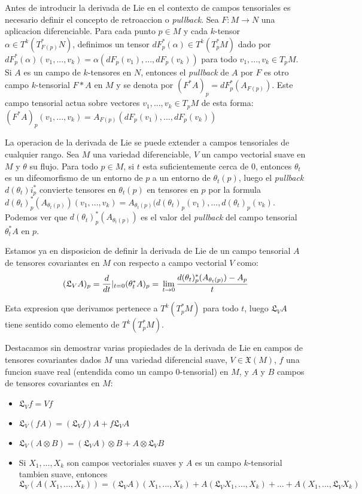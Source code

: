 \documentclass[12pt]{extarticle}
\newcommand{\<}{\langle}
\renewcommand{\>}{\rangle}
\theoremstyle{definition}
\begin{document}
Antes de introducir la derivada de Lie en el contexto de campos tensoriales es
necesario definir el concepto de retroaccion o \emph{pullback}. Sea $F: M
\rightarrow N$ una aplicacion diferenciable. Para cada punto $p \in M$ y cada
$k$-tensor $\alpha \in T^k(T^*_{F(p)}N)$, definimos un tensor $dF^*_p(\alpha)
\in T^k(T^*_pM)$ dado por $dF^*_p(\alpha)(v_1,...,v_k)=
\alpha(dF_p(v_1),...,dF_p(v_k))$ para todo $v_1,...,v_k \in T_pM$. Si $A$ es un
campo de $k$-tensores en $N$, entonces el \emph{pullback} de $A$ por $F$ es otro
campo $k$-tensorial $F*A$ en $M$ y se denota por $(F^*A)_p = dF^*_p(A_{F(p)})$.
Este campo tensorial actua sobre vectores $v_1,...,v_k \in T_pM$ de esta forma:
$(F^*A)_p (v_1,...,v_k) = A_{F(p)} (dF_p(v_1),...,dF_p(v_k))$

La operacion de la derivada de Lie se puede extender a campos tensoriales de
cualquier rango. Sea $M$ una variedad diferenciable, $V$ un campo vectorial
suave en $M$ y $\theta$ su flujo. Para todo $p \in M$, si $t$ esta
suficientemente cerca de $0$, entonces $\theta_t$ es un difeomorfismo de un
entorno de $p$ a un entorno de $\theta_t(p)$, luego el \emph{pullback}
$d(\theta_t)i_p^*$ convierte tensores en $\theta_t(p)$ en tensores en $p$ por la
formula $d(\theta_t)^*_p(A_{\theta_t(p)})(v_1,..., v_k) =
A_{\theta_t(p)}(d(\theta_t)_p(v_1),..., d(\theta_t)_p(v_k)$. Podemos ver que
$d(\theta_t)^*_p(A_{\theta_t(p)})$ es el valor del \emph{pullback} del campo
tensorial $\theta^*_tA$ en $p$.

Estamos ya en disposicion de definir la derivada de Lie de un campo tensorial
$A$ de tensores covariantes en $M$ con respecto a campo vectorial $V$ como:
\begin{equation*}
	(\mathfrak{L}_VA)_p = \dfrac{d}{dt}|_{t=0}(\theta^*_tA)_p = \\
	\lim_{t\to0} \dfrac{d(\theta_t)^*_p(A_{\theta_t(p)}) - A_p}{t}
\end{equation*}

Esta expresion que derivamos pertenece a $T^k(T^*_pM)$ para todo $t$, luego
$\mathfrak{L}_VA$ tiene sentido como elemento de  $T^k(T^*_pM)$.

Destacamos sin demostrar varias propiedades de la derivada de Lie en campos de
tensores covariantes dados $M$ una variedad diferencial suave, $V \in
\mathfrak{X}(M)$, $f$ una funcion suave real (entendida como un campo
$0$-tensorial) en $M$, y $A$ y $B$ campos de tensores covariantes en $M$:

\begin{itemize}
	\item $\mathfrak{L}_V f = V f$
	\item $\mathfrak{L}_V(fA) = (\mathfrak{L}_Vf)A + f \mathfrak{L}_VA$
	\item $\mathfrak{L}_V(A \otimes B) = (\mathfrak{L}_VA) \otimes B + A \otimes
	\mathfrak{L}_VB$
	\item Si $X_1, ..., X_k$ son campos vectoriales suaves y $A$ es un campo
	$k$-tensorial tambien suave, entonces $\mathfrak{L}_V(A(X_1,...,X_k))=
	(\mathfrak{L}_VA)(X_1,...,X_k) + A(\mathfrak{L}_VX_1,..., X_k) + ... +
	A(X_1,..., \mathfrak{L}_VX_k)$
\end{itemize}
\end{document}
